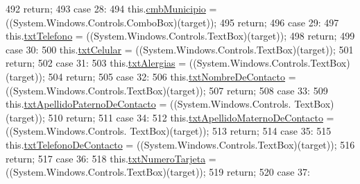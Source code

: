 \begin{DoxyCode}
492             \textcolor{keywordflow}{return};
493             \textcolor{keywordflow}{case} 28:
494             this.\hyperlink{class_proyecto___integrador__3_1_1_main_window_a6fad73b5f18398cb423384f61d36ff9a}{cmbMunicipio} = ((System.Windows.Controls.ComboBox)(target));
495             \textcolor{keywordflow}{return};
496             \textcolor{keywordflow}{case} 29:
497             this.\hyperlink{class_proyecto___integrador__3_1_1_main_window_a3d79de440d7968c622d331dd467c8987}{txtTelefono} = ((System.Windows.Controls.TextBox)(target));
498             \textcolor{keywordflow}{return};
499             \textcolor{keywordflow}{case} 30:
500             this.\hyperlink{class_proyecto___integrador__3_1_1_main_window_ac9cc63316a297453b50f4b8704503109}{txtCelular} = ((System.Windows.Controls.TextBox)(target));
501             \textcolor{keywordflow}{return};
502             \textcolor{keywordflow}{case} 31:
503             this.\hyperlink{class_proyecto___integrador__3_1_1_main_window_a4aae2b3a933df894d92ec27f865332e9}{txtAlergias} = ((System.Windows.Controls.TextBox)(target));
504             \textcolor{keywordflow}{return};
505             \textcolor{keywordflow}{case} 32:
506             this.\hyperlink{class_proyecto___integrador__3_1_1_main_window_afe7d51ab07d58ba85a31a58fce6f7d34}{txtNombreDeContacto} = ((System.Windows.Controls.TextBox)(target));
507             \textcolor{keywordflow}{return};
508             \textcolor{keywordflow}{case} 33:
509             this.\hyperlink{class_proyecto___integrador__3_1_1_main_window_ad353fe2247d841495434638ca24cf97c}{txtApellidoPaternoDeContacto} = ((System.Windows.Controls.
      TextBox)(target));
510             \textcolor{keywordflow}{return};
511             \textcolor{keywordflow}{case} 34:
512             this.\hyperlink{class_proyecto___integrador__3_1_1_main_window_a3fc9dd11451712b3345df9f7a471d9b7}{txtApellidoMaternoDeContacto} = ((System.Windows.Controls.
      TextBox)(target));
513             \textcolor{keywordflow}{return};
514             \textcolor{keywordflow}{case} 35:
515             this.\hyperlink{class_proyecto___integrador__3_1_1_main_window_a0103b8eb21ee11204623d0f08a6acdaf}{txtTelefonoDeContacto} = ((System.Windows.Controls.TextBox)(target));
516             \textcolor{keywordflow}{return};
517             \textcolor{keywordflow}{case} 36:
518             this.\hyperlink{class_proyecto___integrador__3_1_1_main_window_aa002c65e1d03d58932cae92c7523198a}{txtNumeroTarjeta} = ((System.Windows.Controls.TextBox)(target));
519             \textcolor{keywordflow}{return};
520             \textcolor{keywordflow}{case} 37:

\end{DoxyCode}
